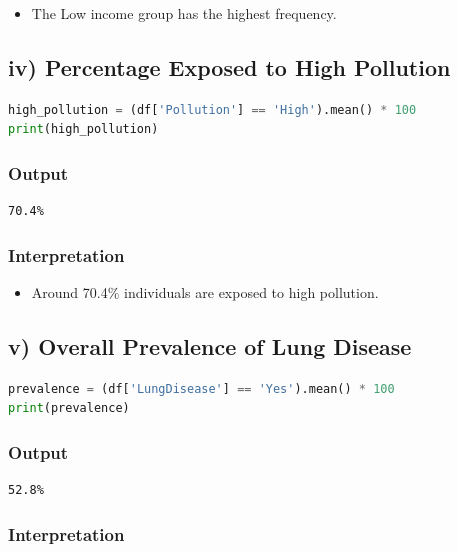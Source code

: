 \documentclass[12pt]{article}
\begin{document}
\begin{itemize}
\item The Low income group has the highest frequency.
\end{itemize}

\subsection*{iv) Percentage Exposed to High Pollution}

\begin{lstlisting}[language=Python]
high_pollution = (df['Pollution'] == 'High').mean() * 100
print(high_pollution)
\end{lstlisting}

\subsubsection*{Output}

\begin{verbatim}
70.4%
\end{verbatim}

\subsubsection*{Interpretation}

\begin{itemize}
\item Around 70.4\% individuals are exposed to high pollution.
\end{itemize}

\subsection*{v) Overall Prevalence of Lung Disease}

\begin{lstlisting}[language=Python]
prevalence = (df['LungDisease'] == 'Yes').mean() * 100
print(prevalence)
\end{lstlisting}

\subsubsection*{Output}

\begin{verbatim}
52.8%
\end{verbatim}

\subsubsection*{Interpretation}
\end{document}
